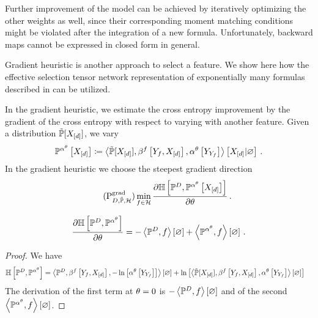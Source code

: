 Further improvement of the model can be achieved by iteratively optimizing the other weights as well, since their corresponding moment matching conditions might be violated after the integration of a new formula.
Unfortunately, backward maps cannot be expressed in closed form in general.




Gradient heuristic is another approach to select a feature.
We show here how the effective selection tensor network representation of exponentially many formulas described in  can be utilized. %

In the gradient heuristic, we estimate the cross entropy improvement by the gradient of the cross entropy with respect to varying with another feature.
Given a distribution $\tilde{\mathbb{P}}[X_{[d]}]$, we vary %
\begin{align*}
    \mathbb{P}^{\alpha^\theta}\left[X_{[d]}\right]
    \coloneqq \left\langle \tilde{\mathbb{P}}[X_{[d]}],\beta^{f}\left[Y_{f},X_{[d]}\right],\alpha^\theta\left[Y_{Y_{f}}\right]\right\rangle \left[ X_{[d]} | \varnothing \right] \, .
\end{align*}
In the gradient heuristic we choose the steepest gradient direction
\begin{align}
    \label{prob:greedyGrad}\tag{$\probtagtypeinst{\gradientsymbol}{\datamap,\secprobtensor,\greedyhypothesis}$}
    \min_{\formula\in\greedyhypothesis} \difofwrt{\centropyof{\empdistribution}{\probofat{\softacttensor}{\shortcatvariables}}}{\canparam}   \, .
\end{align}

\begin{lemma}
    \begin{align*}
        \frac{\partial \mathbb{H}\left[\mathbb{P}^{D},\mathbb{P}^{\alpha^\theta}\right]}{\partial \theta} =
        -\left\langle \mathbb{P}^{D},f\right\rangle \left[ \varnothing \right] + \left\langle \mathbb{P}^{\alpha^\theta},f\right\rangle \left[ \varnothing \right] \, .
    \end{align*}
\end{lemma}
\begin{proof}
    We have
    \begin{align*}
        \mathbb{H}\left[\mathbb{P}^{D},\mathbb{P}^{\alpha^\theta}\right]
        & = \left\langle \mathbb{P}^{D},\beta^{f}\left[Y_{f},X_{[d]}\right],-\ln \left[ \alpha^\theta\left[Y_{Y_{f}}\right] \right]\right\rangle \left[ \varnothing \right]
        + \ln \left[ \left\langle \tilde{\mathbb{P}}[X_{[d]}],\beta^{f}\left[Y_{f},X_{[d]}\right],\alpha^\theta\left[Y_{Y_{f}}\right]\right\rangle \left[ \varnothing \right] \right]
    \end{align*}
    The derivation of the first term at $\theta=0$ is $-\left\langle \mathbb{P}^{D},f\right\rangle \left[ \varnothing \right]$ and of the second $\left\langle \mathbb{P}^{\alpha^\theta},f\right\rangle \left[ \varnothing \right]$.
\end{proof}

